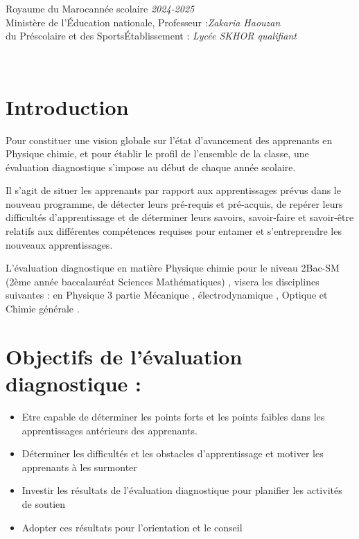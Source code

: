 \documentclass[12pt]{article}
\newcommand\headerMe[2]{\noindent{}#1\hfill#2}
\begin{document}
\headerMe{Royaume du Maroc}{année scolaire \emph{2024-2025}}\\
\headerMe{Ministère de l'Éducation nationale, }{  Professeur :\emph{Zakaria Haouzan}}\\
\headerMe{du Préscolaire et des Sports}{Établissement : \emph{Lycée SKHOR qualifiant}}\\

\begin{center}
\hrulefill
{}
\hrulefill\\
\end{center}


\section[A]{Introduction }
\hspace{0.5cm} Pour constituer une vision globale sur l’état d’avancement des apprenants en Physique chimie, et pour établir le profil de l’ensemble de la classe, une évaluation diagnostique s’impose au début de chaque année scolaire.

Il s’agit de situer les apprenants par rapport aux apprentissages prévus dans le nouveau programme, de détecter leurs pré-requis et pré-acquis, de repérer leurs difficultés d’apprentissage et de déterminer leurs savoirs, savoir-faire et savoir-être relatifs aux différentes compétences requises pour entamer et s’entreprendre les nouveaux apprentissages.

L’évaluation diagnostique en matière Physique chimie pour le niveau 2Bac-SM (2ème année baccalauréat Sciences Mathématiques) , visera les disciplines suivantes : en Physique 3 partie Mécanique , électrodynamique , Optique et Chimie générale .
\section{ Objectifs de l’évaluation diagnostique :}
\begin{itemize}
	\item Etre capable de déterminer les points forts et les points faibles dans les apprentissages antérieurs des apprenants.
	\item Déterminer les difficultés et les obstacles d’apprentissage et motiver les apprenants à les surmonter

	\item Investir les résultats de l’évaluation diagnostique pour planifier les activités de soutien
	\item Adopter ces résultats pour l’orientation et le conseil 

\end{itemize}
\end{document}
